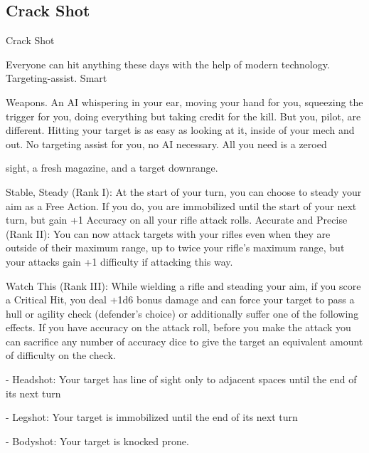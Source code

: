 \subsection{Crack Shot}

                                                   Crack Shot  

Everyone can hit anything these days with the help of modern technology. Targeting-assist. Smart  

Weapons. An AI whispering in your ear, moving your hand for you, squeezing the trigger for you, doing  
everything but taking credit for the kill. But you, pilot, are different. Hitting your target is as easy as looking  
at it, inside of your mech and out. No targeting assist for you, no AI necessary. All you need is a zeroed  

sight, a fresh magazine, and a target downrange.   

Stable, Steady (Rank I): At the start of your turn, you can choose to steady your aim as a Free  
Action. If you do, you are immobilized until the start of your next turn, but gain +1 Accuracy on all  
your rifle attack rolls.  
Accurate and Precise (Rank II): You can now attack targets with your rifles even when they are  
outside of their maximum range, up to twice your rifle’s maximum range, but your attacks gain  
+1 difficulty if attacking this way.
 
Watch This (Rank III): While wielding a rifle and steading your aim, if you score a Critical Hit, you   
deal +1d6 bonus damage and can force your target to pass a hull or agility check (defender’s  
choice) or additionally suffer one of the following effects. If you have accuracy on the attack roll,  
before you make the attack you can sacrifice any number of accuracy dice to give the target an  
equivalent amount of difficulty on the check.
 
     -   Headshot: Your target has line of sight only to adjacent spaces until the end of its next  
         turn
 
     -   Legshot: Your target is immobilized until the end of its next turn
 
     -   Bodyshot: Your target is knocked prone.
 
